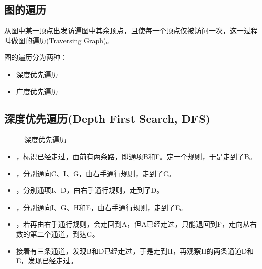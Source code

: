 \subsection{图的遍历}
\begin{frame}\ft{\subsecname}
  \begin{dingyi}
    从图中某一顶点出发访遍图中其余顶点，且使每一个顶点仅被访问一次，这一过程叫做图的遍历(\tf Traversing Graph)。
  \end{dingyi}
  图的遍历分为两种：
  \begin{itemize}
  \item 深度优先遍历
  \item 广度优先遍历
  \end{itemize}
\end{frame}


\subsection{\tf 深度优先遍历(Depth First Search, DFS)}
\begin{frame}\ft{\subsubsecname}
  \begin{figure}
    \centering
    
    \caption{深度优先遍历}    
  \end{figure}
\end{frame}

\begin{frame}\ft{\subsubsecname}
  \begin{itemize}
  \item {}，标识已经走过，面前有两条路，即通项B和F。定一个规则，于是走到了B。\\[0.1in]%
  \item {}，分别通向C、I、G，由右手通行规则，走到了C。\\[0.1in]%
  \item {}，分别通项I、D，由右手通行规则，走到了D。\\[0.1in]%
  \item {}，分别通向I、G、H和E，由右手通行规则，走到了E。\\[0.1in]%
  \item {}，若再由右手通行规则，会走回到A，但A已经走过，只能退回到F，走向从右数的第二个通道，到达G。\\[0.1in]%
  \item 接着有三条通道，发现B和D已经走过，于是走到H，再观察H的两条通道D和E，发现已经走过。
  \end{itemize}
\end{frame}


